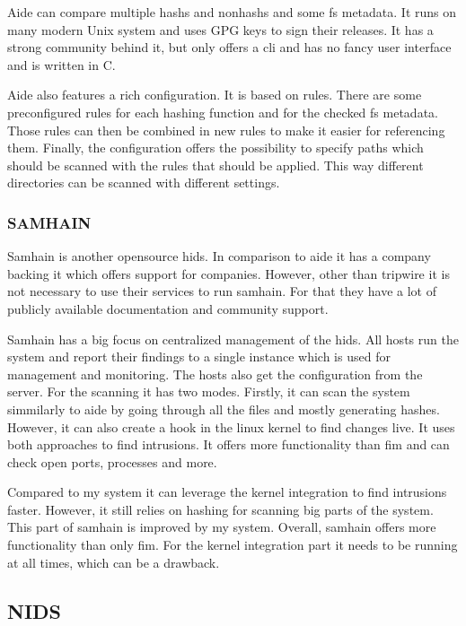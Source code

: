 Aide can compare multiple \glspl{hash} and \glspl{nonhash} and some \gls{fs} \gls{metadata}. It runs on many modern Unix system \cite{aide} and uses GPG keys to sign their releases. It has a strong community behind it, but only offers a \gls{cli} and has no fancy user interface and is written in C. \cite{aide:github} 

Aide also features a rich configuration. It is based on rules. There are some preconfigured rules for each hashing function and for the checked \gls{fs} \gls{metadata}. Those rules can then be combined in new rules to make it easier for referencing them. Finally, the configuration offers the possibility to specify paths which should be scanned with the rules that should be applied. This way different directories can be scanned with different settings. \cite{aide:conf}

\subsubsection{SAMHAIN}

Samhain is another \gls{opensource} \gls{hids}. In comparison to aide it has a company backing it which offers support for companies. However, other than tripwire it is not necessary to use their services to run samhain. For that they have a lot of publicly available documentation and community support. \cite{samhain:company}

Samhain has a big focus on centralized management of the \gls{hids}. All hosts run the system and report their findings to a single instance which is used for management and monitoring. The hosts also get the configuration from the server. For the scanning it has two modes. Firstly, it can scan the system simmilarly to aide by going through all the files and mostly generating hashes. However, it can also create a hook in the linux kernel to find changes live. It uses both approaches to find intrusions. It offers more functionality than \gls{fim} and can check open ports, processes and more. 

Compared to my system it can leverage the kernel integration to find intrusions faster. However, it still relies on hashing for scanning big parts of the system. This part of samhain is improved by my system. Overall, samhain offers more functionality than only \gls{fim}. For the kernel integration part it needs to be running at all times, which can be a drawback. 

\subsection{NIDS}
\label{sec:def:nids}

